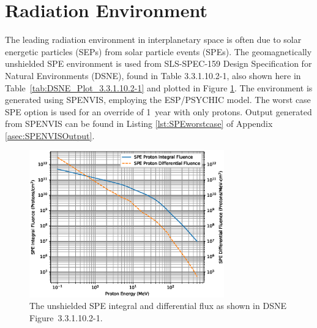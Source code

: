 \documentclass{hitec}
\begin{document}
\section{Radiation Environment}

The leading radiation environment in interplanetary space is often due to solar energetic particles (SEPs) from solar particle events (SPEs). The geomagnetically unshielded SPE environment is used from SLS-SPEC-159 Design Specification for Natural Environments (DSNE), found in Table 3.3.1.10.2-1, also shown here in Table~\ref{tab:DSNE_Plot_3.3.1.10.2-1} and plotted in Figure \ref{fig:DSNE_Plot_3.3.1.10.2-1}. The environment is generated using SPENVIS, employing the ESP/PSYCHIC model. The worst case SPE option is used for an override of 1~year with only protons. Output generated from SPENVIS can be found in Listing \ref{lst:SPEworstcase} of Appendix \ref{asec:SPENVISOutput}.

\begin{figure}[h!]
	\centering
	\includegraphics[width=0.75\textwidth]{DSNE_Plot_3.3.1.10.2-1.eps}
	\caption{The unshielded SPE integral and differential flux as shown in DSNE Figure~3.3.1.10.2-1.}\label{fig:DSNE_Plot_3.3.1.10.2-1}
\end{figure}

\end{document}
